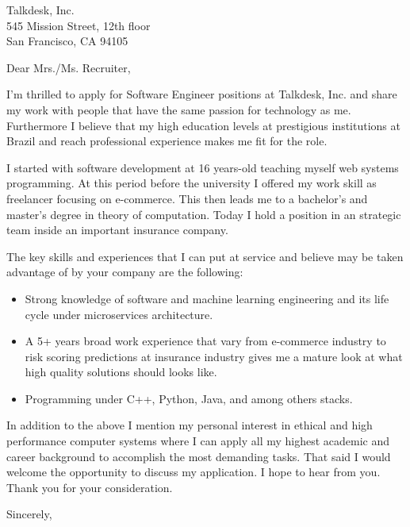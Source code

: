 \documentclass{scrlttr2}
\begin{document}
\renewcommand{\enclname}{Enclosures}

\begin{letter}{%
    Talkdesk, Inc.\\
    545 Mission Street, 12th floor\\
    San Francisco, CA 94105%
  }

  \opening{Dear Mrs./Ms. Recruiter,}

  I'm thrilled to apply for Software Engineer positions at Talkdesk, Inc. and
  share my work with people that have the same passion for technology as
  me. Furthermore I believe that my high education levels at prestigious
  institutions at Brazil and reach professional experience makes me fit for the
  role.

  I started with software development at 16 years-old teaching myself web
  systems programming. At this period before the university I offered my work
  skill as freelancer focusing on e-commerce. This then leads me to a bachelor's
  and master's degree in theory of computation. Today I hold a position in an
  strategic team inside an important insurance company.

  The key skills and experiences that I can put at service and believe may be
  taken advantage of by your company are the following:

  \begin{itemize}
  \item Strong knowledge of software and machine learning engineering and its
    life cycle under microservices architecture.
  \item A 5+ years broad work experience that vary from e-commerce industry to
    risk scoring predictions at insurance industry gives me a mature look at
    what high quality solutions should looks like.
  \item Programming under C++, Python, Java, and among others stacks.
  \end{itemize}

  In addition to the above I mention my personal interest in ethical and high
  performance computer systems where I can apply all my highest academic and
  career background to accomplish the most demanding tasks. That said I would
  welcome the opportunity to discuss my application. I hope to hear from
  you. Thank you for your consideration.

  \closing{Sincerely,}


\end{letter}
\end{document}
